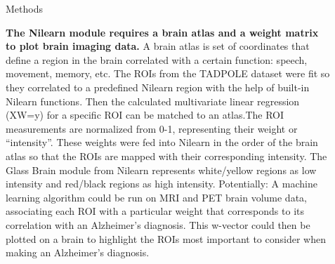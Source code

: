 \documentclass[final]{beamer}
\newlength{\sepwid}
\newlength{\onecolwid}
\newlength{\twocolwid}
\begin{document}
\begin{frame}[t]
\begin{columns}[t]
\begin{column}{\onecolwid}
            

        
        
    
    \end{column} %
    
    \begin{column}{\sepwid}\end{column} %
    
    \begin{column}{\twocolwid} %
    
       \begin{alertblock}{Methods}
        
            \textbf{The Nilearn module requires a brain atlas and a weight matrix to plot brain imaging data.} A brain atlas is set of coordinates that define a region in the brain correlated with a certain function: speech, movement, memory, etc. The ROIs from the TADPOLE dataset were fit so they correlated to a predefined Nilearn region with the help of built-in Nilearn functions. Then the calculated multivariate linear regression (XW=y) for a specific ROI can be matched to an atlas.The ROI measurements are normalized from 0-1, representing their weight or “intensity”. These weights were fed into Nilearn in the order of the brain atlas so that the ROIs are mapped with their corresponding intensity. The Glass Brain module from Nilearn represents white/yellow regions as low intensity and red/black regions as high intensity.   
            \linebreak
            \linebreak Potentially: A machine learning algorithm could be run on MRI and PET brain volume data, associating each ROI with a particular weight that corresponds to its correlation with an Alzheimer’s diagnosis. This w-vector could then be plotted on a brain to highlight the ROIs most important to consider when making an Alzheimer’s diagnosis. 
        \end{alertblock}
        

\end{column}
\end{columns}
\end{frame}
\end{document}

